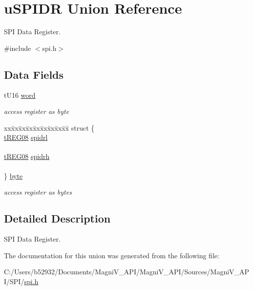 \hypertarget{unionu_s_p_i_d_r}{}\section{u\+S\+P\+I\+D\+R Union Reference}
\label{unionu_s_p_i_d_r}


S\+P\+I Data Register.  




{\ttfamily \#include $<$spi.\+h$>$}

\subsection*{Data Fields}
\begin{DoxyCompactItemize}
\item 
\hypertarget{unionu_s_p_i_d_r_a740c6e01add2b9960472a1c87ee4e013}{}t\+U16 \hyperlink{unionu_s_p_i_d_r_a740c6e01add2b9960472a1c87ee4e013}{word}\label{unionu_s_p_i_d_r_a740c6e01add2b9960472a1c87ee4e013}

\begin{DoxyCompactList}\small\item\em access register as byte \end{DoxyCompactList}\item 
\hypertarget{unionu_s_p_i_d_r_a76a45f3e5d36b8f6ec4c6683ec570c14}{}\begin{tabbing}
xx\=xx\=xx\=xx\=xx\=xx\=xx\=xx\=xx\=\kill
struct \{\\
\>\hyperlink{unionu_r_e_g08}{tREG08} \hyperlink{unionu_s_p_i_d_r_afa5a7a8cd85be10c7a0faf54e6d7064e}{spidrl}\\
\>\\
\>\hyperlink{unionu_r_e_g08}{tREG08} \hyperlink{unionu_s_p_i_d_r_a38e7545b0612ee1e3c78f6b11a1f227b}{spidrh}\\
\>\\
\} \hyperlink{unionu_s_p_i_d_r_a76a45f3e5d36b8f6ec4c6683ec570c14}{byte}\label{unionu_s_p_i_d_r_a76a45f3e5d36b8f6ec4c6683ec570c14}
\\

\end{tabbing}\begin{DoxyCompactList}\small\item\em access register as bytes \end{DoxyCompactList}\end{DoxyCompactItemize}


\subsection{Detailed Description}
S\+P\+I Data Register. 

The documentation for this union was generated from the following file\+:\begin{DoxyCompactItemize}
\item 
C\+:/\+Users/b52932/\+Documents/\+Magni\+V\+\_\+\+A\+P\+I/\+Magni\+V\+\_\+\+A\+P\+I/\+Sources/\+Magni\+V\+\_\+\+A\+P\+I/\+S\+P\+I/\hyperlink{spi_8h}{spi.\+h}\end{DoxyCompactItemize}

